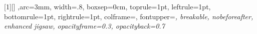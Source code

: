 [1][]{
    ,arc=3mm,
width=.8\textwidth,%
    boxsep=0cm,
    toprule=1pt,
    leftrule=1pt,
    bottomrule=1pt,
    rightrule=1pt,
    colframe=\TitlePageColor,
    fontupper=\raggedleft\fontsize{16pt}{14pt}\itshape,
    breakable,
    nobeforeafter,
    enhanced jigsaw,
    opacityframe=0.3,
    opacityback=0.7
}
\makeatother







